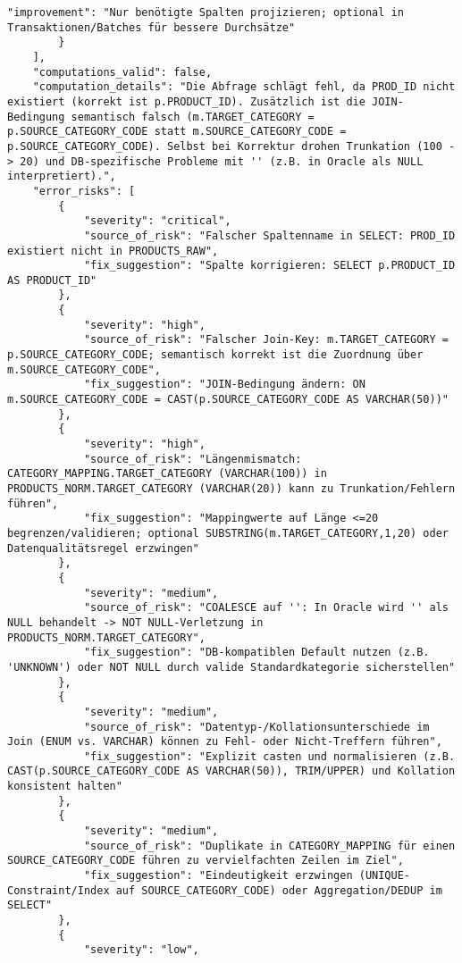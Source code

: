 \begin{lstlisting}[caption={Ausgabe: GPT-5 Anwendungsfall 6 Konsistenzdurchlauf},label={gpt_case6_prompt2}]
            "improvement": "Nur benötigte Spalten projizieren; optional in Transaktionen/Batches für bessere Durchsätze"
        }
    ],
    "computations_valid": false,
    "computation_details": "Die Abfrage schlägt fehl, da PROD_ID nicht existiert (korrekt ist p.PRODUCT_ID). Zusätzlich ist die JOIN-Bedingung semantisch falsch (m.TARGET_CATEGORY = p.SOURCE_CATEGORY_CODE statt m.SOURCE_CATEGORY_CODE = p.SOURCE_CATEGORY_CODE). Selbst bei Korrektur drohen Trunkation (100 -> 20) und DB-spezifische Probleme mit '' (z.B. in Oracle als NULL interpretiert).",
    "error_risks": [
        {
            "severity": "critical",
            "source_of_risk": "Falscher Spaltenname in SELECT: PROD_ID existiert nicht in PRODUCTS_RAW",
            "fix_suggestion": "Spalte korrigieren: SELECT p.PRODUCT_ID AS PRODUCT_ID"
        },
        {
            "severity": "high",
            "source_of_risk": "Falscher Join-Key: m.TARGET_CATEGORY = p.SOURCE_CATEGORY_CODE; semantisch korrekt ist die Zuordnung über m.SOURCE_CATEGORY_CODE",
            "fix_suggestion": "JOIN-Bedingung ändern: ON m.SOURCE_CATEGORY_CODE = CAST(p.SOURCE_CATEGORY_CODE AS VARCHAR(50))"
        },
        {
            "severity": "high",
            "source_of_risk": "Längenmismatch: CATEGORY_MAPPING.TARGET_CATEGORY (VARCHAR(100)) in PRODUCTS_NORM.TARGET_CATEGORY (VARCHAR(20)) kann zu Trunkation/Fehlern führen",
            "fix_suggestion": "Mappingwerte auf Länge <=20 begrenzen/validieren; optional SUBSTRING(m.TARGET_CATEGORY,1,20) oder Datenqualitätsregel erzwingen"
        },
        {
            "severity": "medium",
            "source_of_risk": "COALESCE auf '': In Oracle wird '' als NULL behandelt -> NOT NULL-Verletzung in PRODUCTS_NORM.TARGET_CATEGORY",
            "fix_suggestion": "DB-kompatiblen Default nutzen (z.B. 'UNKNOWN') oder NOT NULL durch valide Standardkategorie sicherstellen"
        },
        {
            "severity": "medium",
            "source_of_risk": "Datentyp-/Kollationsunterschiede im Join (ENUM vs. VARCHAR) können zu Fehl- oder Nicht-Treffern führen",
            "fix_suggestion": "Explizit casten und normalisieren (z.B. CAST(p.SOURCE_CATEGORY_CODE AS VARCHAR(50)), TRIM/UPPER) und Kollation konsistent halten"
        },
        {
            "severity": "medium",
            "source_of_risk": "Duplikate in CATEGORY_MAPPING für einen SOURCE_CATEGORY_CODE führen zu vervielfachten Zeilen im Ziel",
            "fix_suggestion": "Eindeutigkeit erzwingen (UNIQUE-Constraint/Index auf SOURCE_CATEGORY_CODE) oder Aggregation/DEDUP im SELECT"
        },
        {
            "severity": "low",

\end{lstlisting}
